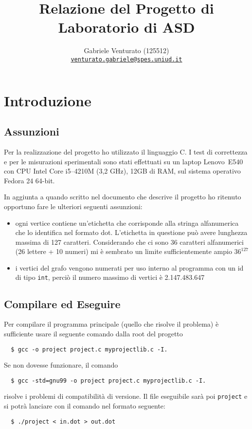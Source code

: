 \documentclass[a4paper,8pt]{article}
\newcommand{\mail}[1]{\href{mailto:#1}{\texttt{#1}}}
\theoremstyle{definition}
\begin{document}
\author{Gabriele Venturato (125512)\\\mail{venturato.gabriele@spes.uniud.it}}
\title{Relazione del Progetto di Laboratorio di ASD}{}
\docdate{}
\maketitle

\tableofcontents
\newpage


\section{Introduzione}
\subsection{Assunzioni}
Per la realizzazione del progetto ho utilizzato il linguaggio C. I test di
correttezza e per le misurazioni sperimentali sono stati effettuati su un
laptop \mbox{Lenovo~E540} con CPU Intel Core i5--4210M (3,2 GHz), 12GB di RAM,
sul sistema operativo Fedora 24 64-bit.

In aggiunta a quando scritto nel documento che descrive il progetto ho ritenuto
opportuno fare le ulteriori seguenti assunzioni:
\begin{itemize}
  \item ogni vertice contiene un'etichetta che corrisponde alla stringa alfanumerica
    che lo identifica nel formato dot. L'etichetta in questione può avere lunghezza
    massima di 127 caratteri. Considerando che ci sono 36 caratteri alfanumerici
    (26 lettere + 10 numeri) mi è sembrato un limite sufficientemente ampio $36^{127}$
  \item i vertici del grafo vengono numerati per uso interno al programma con un
    id di tipo \texttt{int}, perciò il numero massimo di vertici è 2.147.483.647
\end{itemize}

\subsection{Compilare ed Eseguire}
Per compilare il programma principale (quello che risolve il problema) è sufficiente
usare il seguente comando dalla root del progetto
\begin{verbatim}
  $ gcc -o project project.c myprojectlib.c -I.
\end{verbatim}
Se non dovesse funzionare, il comando
\begin{verbatim}
  $ gcc -std=gnu99 -o project project.c myprojectlib.c -I.
\end{verbatim}
risolve i problemi di compatibilità di versione. Il file eseguibile sarà poi
\verb!project! e si potrà lanciare con il comando nel formato seguente:
\begin{verbatim}
  $ ./project < in.dot > out.dot
\end{verbatim}
\end{document}
